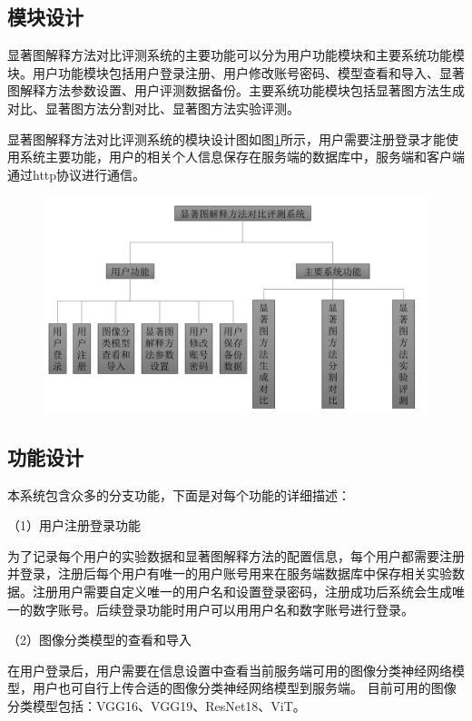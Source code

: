 \subsection{模块设计}
显著图解释方法对比评测系统的主要功能可以分为用户功能模块和主要系统功能模块。用户功能模块包括用户登录注册、用户修改账号密码、模型查看和导入、显著图解释方法参数设置、用户评测数据备份。主要系统功能模块包括显著图方法生成对比、显著图方法分割对比、显著图方法实验评测。

显著图解释方法对比评测系统的模块设计图如图\ref{fig:function}所示，用户需要注册登录才能使用系统主要功能，用户的相关个人信息保存在服务端的数据库中，服务端和客户端通过http协议进行通信。

\begin{figure}[!ht]
	\centering 
	\includegraphics[width=15cm]{fig/ch5/function.png}
	\label{fig:function}
\end{figure}

\subsection{功能设计}

本系统包含众多的分支功能，下面是对每个功能的详细描述：

（1）用户注册登录功能

为了记录每个用户的实验数据和显著图解释方法的配置信息，每个用户都需要注册并登录，注册后每个用户有唯一的用户账号用来在服务端数据库中保存相关实验数据。注册用户需要自定义唯一的用户名和设置登录密码，注册成功后系统会生成唯一的数字账号。后续登录功能时用户可以用用户名和数字账号进行登录。

（2）图像分类模型的查看和导入

在用户登录后，用户需要在信息设置中查看当前服务端可用的图像分类神经网络模型，用户也可自行上传合适的图像分类神经网络模型到服务端。
目前可用的图像分类模型包括：VGG16、VGG19、ResNet18、ViT。

